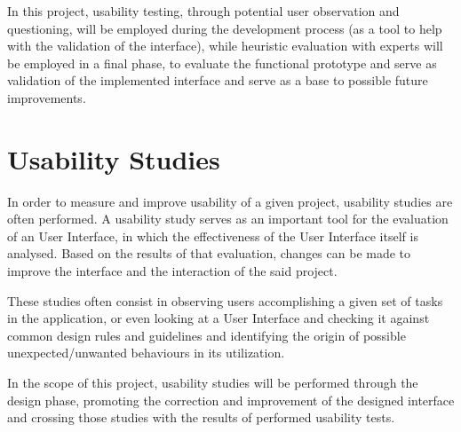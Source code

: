 In this project, usability testing, through potential user observation and questioning, will be employed during the development process (as a tool to help with the validation of the interface), while heuristic evaluation with experts will be employed in a final phase, to evaluate the functional prototype and serve as validation of the implemented interface and serve as a base to possible future improvements.

\section{Usability Studies}

In order to measure and improve usability of a given project, usability studies are often performed. A usability study serves as an important tool for the evaluation of an User Interface, in which the effectiveness of the User Interface itself is analysed. Based on the results of that evaluation, changes can be made to improve the interface and the interaction of the said project.

These studies often consist in observing users accomplishing a given set of tasks in the application, or even looking at a User Interface and checking it against common design rules and guidelines \cite{kn:Joh14} and identifying the origin of possible unexpected/unwanted behaviours in its utilization. 

In the scope of this project, usability studies will be performed through the design phase, promoting the correction and improvement of the designed interface and crossing those studies with the results of performed usability tests.








